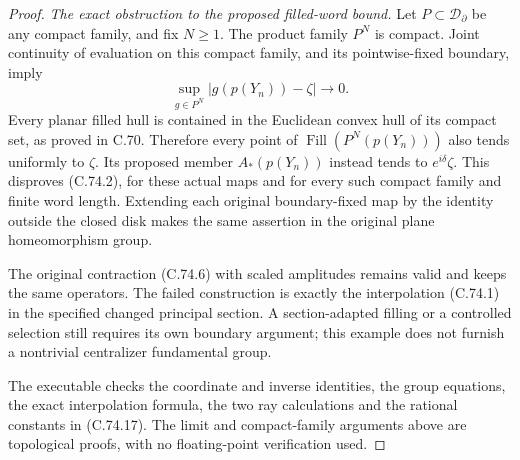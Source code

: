 \begin{proof}
\emph{The exact obstruction to the proposed filled-word bound.}
Let $P\subset\mathcal D_\partial$ be any
compact family, and fix $N\geq1$.
The product family $P^N$ is compact.
Joint continuity of evaluation on this
compact family, and its pointwise-fixed
boundary, imply
\[
 \sup_{g\in P^N}|g(p(Y_n))-\zeta|\longrightarrow0.
                                                               \tag{C.74.18}
\]
Every planar filled hull is contained
in the Euclidean convex hull of its
compact set, as proved in C.70.
Therefore every point of
$\operatorname{Fill}(P^N(p(Y_n)))$
also tends uniformly to $\zeta$.
Its proposed member $A_*(p(Y_n))$
instead tends to $e^{i\delta}\zeta$.
This disproves (C.74.2), for these
actual maps and for every such
compact family and finite word length.
Extending each original boundary-fixed
map by the identity outside the closed
disk makes the same assertion in the
original plane homeomorphism group.

The original contraction (C.74.6)
with scaled amplitudes remains valid
and keeps the same operators.
The failed construction is exactly
the interpolation (C.74.1) in the
specified changed principal section.
A section-adapted filling or a
controlled selection still requires
its own boundary argument; this
example does not furnish a nontrivial
centralizer fundamental group.

The executable
checks the coordinate and inverse
identities, the group equations,
the exact interpolation formula,
the two ray calculations and the
rational constants in (C.74.17).
The limit and compact-family
arguments above are topological
proofs, with no floating-point
verification used.
\end{proof}
